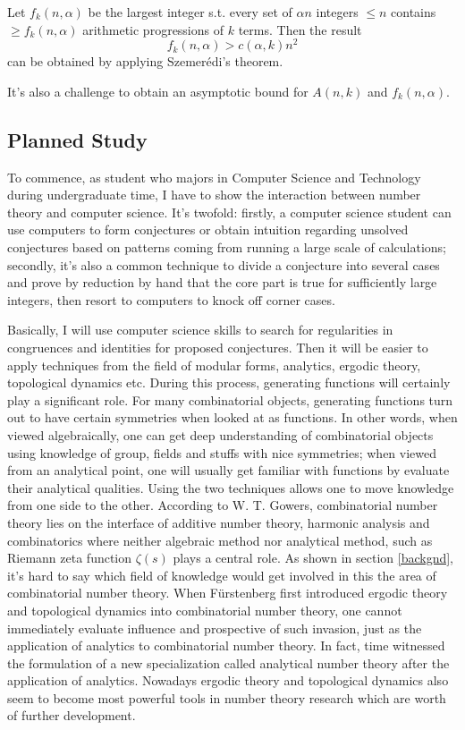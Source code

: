 \documentclass[12pt]{article}
\begin{document}
Let $f_k(n, \alpha)$ be the largest integer s.t. every set of $\alpha n$ integers $\leq n$ contains $\geq f_k(n, \alpha)$ arithmetic progressions of $k$ terms. Then the result 
\begin{equation}
f_k(n, \alpha)>c(\alpha, k)n^2
\end{equation}
can be obtained by applying Szemer\'{e}di's theorem. 

It's also a challenge to obtain an asymptotic bound for $A(n, k)$ and $f_k(n, \alpha)$.

\bigskip

\subsection{Planned Study}

To commence, as student who majors in Computer Science and Technology during undergraduate time, I have to show the interaction between number theory and computer science. It's twofold: firstly, a computer science student can use computers to form conjectures or obtain intuition regarding unsolved conjectures based on patterns coming from running a large scale of calculations; secondly, it's also a common technique to divide a conjecture into several cases and prove by reduction by hand that the core part is true for sufficiently large integers, then resort to computers to knock off corner cases. 

Basically, I will use computer science skills to search for regularities in congruences and identities for proposed conjectures. Then it will be easier to apply techniques from the field of modular forms, analytics, ergodic theory, topological dynamics etc. During this process, generating functions will certainly play a significant role. For many combinatorial objects, generating functions turn out to have certain symmetries when looked at as functions. In other words, when viewed algebraically, one can get deep understanding of combinatorial objects using knowledge of group, fields and stuffs with nice symmetries; when viewed from an analytical point, one will usually get familiar with functions by evaluate their analytical qualities. Using the two techniques allows one to move knowledge from one side to the other. According to W. T. Gowers\cite{gowers}, combinatorial number theory lies on the interface of additive number theory, harmonic analysis and combinatorics where neither algebraic method nor analytical method, such as Riemann zeta function $\zeta(s)$ plays a central role. As shown in section \ref{backgnd}, it's hard to say which field of knowledge would get involved in this the area of combinatorial number theory. When F\"{u}rstenberg first introduced ergodic theory and topological dynamics into combinatorial number theory, one cannot immediately evaluate influence and prospective of such invasion, just as the application of analytics to combinatorial number theory. In fact, time witnessed the formulation of a new specialization called analytical number theory after the application of analytics. Nowadays ergodic theory and topological dynamics also seem to become most powerful tools in number theory research which are worth of further development.
\end{document}
